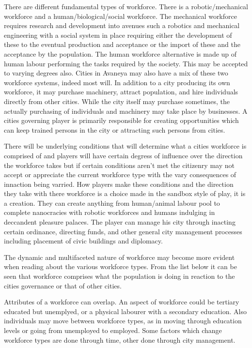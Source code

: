 There are different fundamental types of workforce. There is a robotic/mechanical workforce and a human/biological/social workforce. The mechanical workforce requires research and development into avenues such a robotics and mechanical engineering with a social system in place requiring either the development of these to the eventual production and acceptance or the import of these and the acceptance by the population. The human workforce alternative is made up of human labour performing the tasks required by the society. This may be accepted to varying degrees also. Cities in Avaneya may also have a mix of these two workforce systems, indeed most will. In addition to a city producing its own workforce, it may purchase machinery, attract population, and hire individuals directly from other cities. While the city itself may purchase sometimes, the actually purchasing of individuals and machinery may take place by businesses. A cities governing player is primarily responsible for creating opportunities which can keep trained persons in the city or attracting such persons from cities. 

There will be underlying conditions that will determine what a cities workforce is comprised of and players will have certain degress of influence over the direction the workforce takes but if certain conditions aren't met the citizenry may not accept or appreciate the current workforce type with the vary consequences of innaction being varried. How players make these conditions and the direction they take with there workforce is a choice made in the sandbox style of play, it is a creation. They can create anything from human/animal labour pool to complete nanocracies with robotic workforces and humans indulging in deccandent pleasure palaces. The player can manage his city through inacting certain ordinance, directing funds, and other general city management processes including placement of civic buildings and diplomacy. 

The dynamic and multifaceted nature of workforce may become more evident when reading about the various workforce types. From the list below it can be seen that workforce comprises what the population is doing in reaction to the cities governance or that of other cities.

Attributes of a workforce can overlap. An aspect of workforce could be tertiary educated but unemplyed, or a physical labourer with a secondary education. Also individuals may move between workforce types, as in moving through education levels or going from unemployed to employed. Some factors which change workforce types are done through time, other done through city management.

